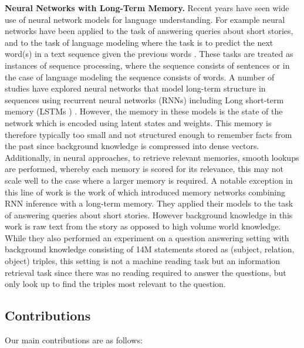 \documentclass[jair,twoside,11pt,theapa]{article}
\renewcommand{\paragraph}[1]{\noindent\textbf{#1.}}
\begin{document}
\paragraph{Neural Networks with Long-Term Memory}  Recent years have seen wide use of neural network models  for language understanding. For example neural networks have been applied to the task of answering queries about short stories,  and to the task of language modeling where the task is to predict the next word(s) in a text sequence given the previous
words \cite{MikolovKBCK10,SundermeyerSN12,WestonCB14,sukhbaatar2015end}. These tasks are  treated as instances of sequence processing, where the sequence consists of sentences or   in the case of language modeling the  sequence consists of  words. A number of studies have explored neural networks that model  long-term  structure in sequences
using recurrent neural networks (RNNs) including Long short-term memory  (LSTMs ) \cite{hochreiter1997long,atkeson1995memory,graves2013generating}. However, the memory in these models is the state
of the network which is encoded using latent states and weights. This memory is therefore typically  too small  and  not structured enough
to  remember facts from the past since background knowledge is compressed into dense vectors.  Additionally, in neural approaches, to retrieve relevant memories, 
smooth lookups are performed, whereby each memory is scored for its relevance, this may not scale well to the case where a larger memory is required. A notable exception in this line of work  is the work of \cite{WestonCB14} which introduced  memory networks  combining RNN inference with a long-term memory. They applied their models to the  task of answering queries about short stories. However background knowledge in this work is raw text from the story  as opposed to high volume world knowledge.  While they also performed an experiment on a question answering setting with   background knowledge consisting  of 14M  statements stored as (subject, relation, object) triples, this setting  is not a machine reading task but  an information retrieval task since there was no reading required to answer the questions, but only look up to find the triples most relevant to  the question.



\subsection{Contributions}
Our main contributions are as follows:
 
\end{document}
